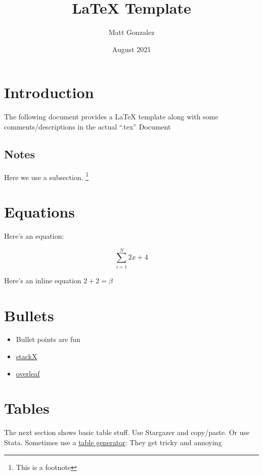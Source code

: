 \documentclass[12pt]{article}
\title{LaTeX Template}
\author{Matt Gonzalez}
\date{August 2021}
\begin{document}
\maketitle


\section{Introduction}
The following document provides a LaTeX template along with some comments/descriptions in the actual ``.tex'' Document
 
 
\subsection{Notes}
Here we use a subsection. \footnote{This is a footnote}



\section{Equations}

Here's an equation:

\begin{equation}
	\sum_{i=1}^N 2x +4 
\end{equation}

Here's an inline equation $2+2=\beta$


\section{Bullets}

\begin{itemize}
	\item{Bullet points are fun}
	\item{\href{https://tex.stackexchange.com/} {stackX}}
	\item{\href{https://www.overleaf.com/learn/latex/Hyperlinks}{overleaf}}
\end{itemize}


\clearpage



\section{Tables} 

The next section shows basic table stuff. Use Stargazer and copy/paste. Or use Stata. Sometimes use a \href{https://www.tablesgenerator.com/}{table generator}: They get tricky and annoying
\end{document}
